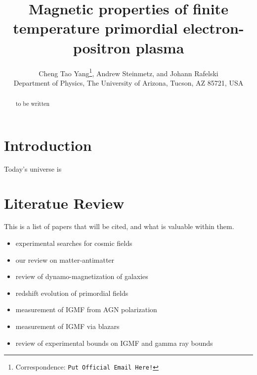 \documentclass[a4paper]{article}
\title{\boldmath Magnetic properties of finite temperature primordial electron-positron plasma}
\author{Cheng Tao Yang\orc{\orcB}\thanks{Correspondence: \texttt{Put Official Email Here!}}, Andrew Steinmetz\orc{\orcC}, and Johann Rafelski\orc{\orcA}\\
Department of Physics, The University of Arizona, Tucson, AZ 85721, USA}
\begin{document}
\maketitle

\begin{abstract}
    to be written
\end{abstract}


\section{Introduction}\label{sec:Introduction}
\noindent Today's universe is 

\section{Literatue Review}\label{sec:LitReview}
This is a list of papers that will be cited, and what is valuable within them.
\begin{itemize}
    \item \cite{gaensler2004origin} experimental searches for cosmic fields
    \item \cite{rafelski2023short} our review on matter-antimatter
    \item \cite{kronberg1994extragalactic} review of dynamo-magnetization of galaxies
    \item \cite{pomakov2022redshift} redshift evolution of primordial fields
    \item \cite{vernstrom2021discovery} measurement of IGMF from AGN polarization
    \item \cite{taylor2011extragalactic} measurement of IGMF via blazars
    \item \cite{batista2021gammaray} review of experimental bounds on IGMF and gamma ray bounds
\end{itemize}



\end{document}
